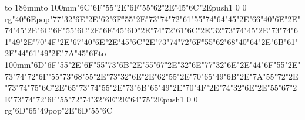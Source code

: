 \hbox to 186mm{\hsize=81mm\vbox to 100mm{\vfill\ipa\char"6C\ipa\char"6F\ipa\char"55\ipa\char"2E\ipa\char"6F\ipa\char"55\ipa\char"62\ipa\char"2E\ipa\char"45\ipa\char"6C\ipa\char"2E\pdfcolorstack\match push{1 0 0 rg}\ipa\char"40\ipa\char"6E\pdfcolorstack\match pop{}\medskip\ipa\char"77\ipa\char"32\ipa\char"6E\ipa\char"2E\ipa\char"62\ipa\char"6F\ipa\char"55\ipa\char"2E\ipa\char"73\ipa\char"74\ipa\char"72\ipa\char"61\ipa\char"55\ipa\char"74\medskip\ipa\char"64\ipa\char"45\ipa\char"2E\ipa\char"66\ipa\char"40\ipa\char"6E\ipa\char"2E\ipa\char"74\ipa\char"45\ipa\char"2E\ipa\char"6C\ipa\char"6F\ipa\char"55\ipa\char"6C\ipa\char"2E\ipa\char"6E\ipa\char"45\ipa\char"6D\ipa\char"2E\ipa\char"74\ipa\char"72\ipa\char"61\ipa\char"6C\ipa\char"2E\ipa\char"32\ipa\char"73\ipa\char"74\medskip\ipa\char"45\ipa\char"2E\ipa\char"73\ipa\char"74\ipa\char"61\ipa\char"49\ipa\char"2E\ipa\char"70\ipa\char"4F\ipa\char"2E\ipa\char"67\ipa\char"40\ipa\char"6E\ipa\char"2E\ipa\char"45\ipa\char"6C\ipa\char"2E\ipa\char"73\ipa\char"74\ipa\char"72\ipa\char"6F\ipa\char"55\ipa\char"62\medskip\ipa\char"68\ipa\char"40\ipa\char"64\ipa\char"2E\ipa\char"6B\ipa\char"61\ipa\char"2E\ipa\char"44\ipa\char"61\ipa\char"49\ipa\char"2E\ipa\char"7A\ipa\char"45\ipa\char"6E\vfill}\hfill\vbox to 100mm{\vfill\ipa\char"6D\ipa\char"6F\ipa\char"55\ipa\char"2E\ipa\char"6F\ipa\char"55\ipa\char"73\ipa\char"6B\ipa\char"2E\ipa\char"55\ipa\char"67\ipa\char"2E\ipa\char"32\ipa\char"6E\medskip\ipa\char"77\ipa\char"32\ipa\char"6E\ipa\char"2E\ipa\char"44\ipa\char"6F\ipa\char"55\ipa\char"2E\ipa\char"73\ipa\char"74\ipa\char"72\ipa\char"6F\ipa\char"55\ipa\char"73\medskip\ipa\char"68\ipa\char"55\ipa\char"2E\ipa\char"73\ipa\char"32\ipa\char"6E\ipa\char"2E\ipa\char"62\ipa\char"55\ipa\char"2E\ipa\char"70\ipa\char"65\ipa\char"49\ipa\char"6B\ipa\char"2E\ipa\char"7A\ipa\char"55\ipa\char"72\ipa\char"2E\ipa\char"73\ipa\char"74\ipa\char"75\ipa\char"6C\ipa\char"2E\ipa\char"65\ipa\char"73\ipa\char"74\medskip\ipa\char"55\ipa\char"2E\ipa\char"73\ipa\char"6B\ipa\char"65\ipa\char"49\ipa\char"2E\ipa\char"70\ipa\char"4F\ipa\char"2E\ipa\char"74\ipa\char"32\ipa\char"6E\ipa\char"2E\ipa\char"55\ipa\char"67\ipa\char"2E\ipa\char"73\ipa\char"74\ipa\char"72\ipa\char"6F\ipa\char"55\ipa\char"72\medskip\ipa\char"74\ipa\char"32\ipa\char"6E\ipa\char"2E\ipa\char"64\ipa\char"75\ipa\char"2E\pdfcolorstack\match push{1 0 0 rg}\ipa\char"6D\ipa\char"65\ipa\char"49\pdfcolorstack\match pop{}\ipa\char"2E\ipa\char"6D\ipa\char"55\ipa\char"6C\vfill}}\eject
